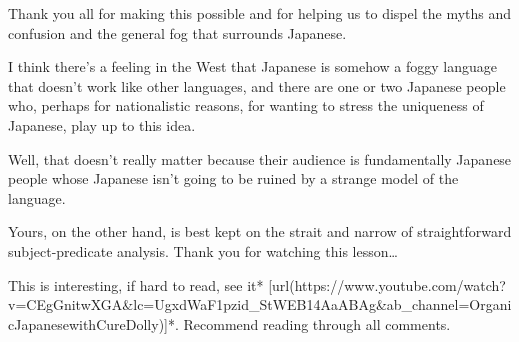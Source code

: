 Thank you all for making this possible and for helping us to dispel the myths and confusion and the general fog that surrounds Japanese.

I think there's a feeling in the West that Japanese is somehow a foggy language that doesn't work like other languages, and there are one or two Japanese people who, perhaps for nationalistic reasons, for wanting to stress the uniqueness of Japanese, play up to this idea.

Well, that doesn't really matter because their audience is fundamentally Japanese people whose Japanese isn't going to be ruined by a strange model of the language.

Yours, on the other hand, is best kept on the strait and narrow of straightforward subject-predicate analysis. Thank you for watching this lesson\ldots{}

This is interesting, if hard to read, see it* [url(https://www.youtube.com/watch?v=CEgGnitwXGA&lc=UgxdWaF1pzid_StWEB14AaABAg&ab_channel=OrganicJapanesewithCureDolly)]*. Recommend reading through all comments.

{}

{}

\stopsectionlevel

\stopsectionlevel
